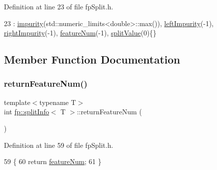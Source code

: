 Definition at line 23 of file fp\+Split.\+h.


\begin{DoxyCode}
23 : \hyperlink{classfp_1_1splitInfo_aada04419633efd2c337ee25a654f3339}{impurity}(std::numeric\_limits<double>::max()), \hyperlink{classfp_1_1splitInfo_a07ad3b8d248d48e3157aa44a2452bc8c}{leftImpurity}(-1), 
      \hyperlink{classfp_1_1splitInfo_ac70a7dadd873d5bb1535fb0e5bea45fc}{rightImpurity}(-1), \hyperlink{classfp_1_1splitInfo_a77b83bf0d03ad4a6918a1250ddab65d2}{featureNum}(-1), \hyperlink{classfp_1_1splitInfo_a38374c82d5d58eafebb71b7aea024147}{splitValue}(0)\{\}
\end{DoxyCode}


\subsection{Member Function Documentation}
\mbox{\label{classfp_1_1splitInfo_a6b0cdcf767630429747281fd31691967}} 
\subsubsection{\texorpdfstring{return\+Feature\+Num()}{returnFeatureNum()}}
{\footnotesize\ttfamily template$<$typename T$>$ \\
int \hyperlink{classfp_1_1splitInfo}{fp\+::split\+Info}$<$ T $>$\+::return\+Feature\+Num (\begin{DoxyParamCaption}{ }\end{DoxyParamCaption})\hspace{0.3cm}{\ttfamily [inline]}}



Definition at line 59 of file fp\+Split.\+h.


\begin{DoxyCode}
59                                              \{
60                     \textcolor{keywordflow}{return} \hyperlink{classfp_1_1splitInfo_a77b83bf0d03ad4a6918a1250ddab65d2}{featureNum};
61                 \}
\end{DoxyCode}
\mbox{\label{classfp_1_1splitInfo_aa4890dfa907252fc9a669a0e328acef2}} 
